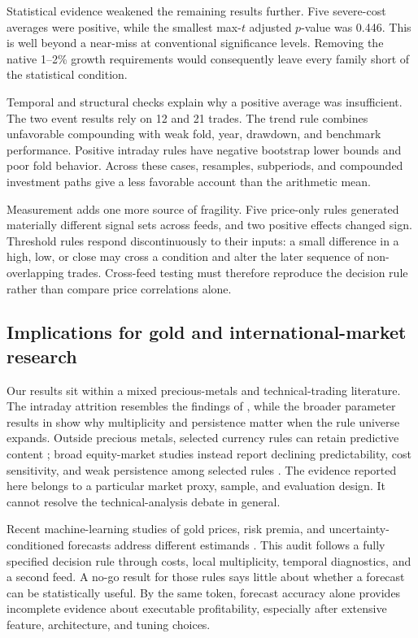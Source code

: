 Statistical evidence weakened the remaining results further. Five severe-cost averages were positive, while the smallest max-$t$ adjusted $p$-value was 0.446. This is well beyond a near-miss at conventional significance levels. Removing the native 1--2\% growth requirements would consequently leave every family short of the statistical condition.

Temporal and structural checks explain why a positive average was insufficient. The two event results rely on 12 and 21 trades. The trend rule combines unfavorable compounding with weak fold, year, drawdown, and benchmark performance. Positive intraday rules have negative bootstrap lower bounds and poor fold behavior. Across these cases, resamples, subperiods, and compounded investment paths give a less favorable account than the arithmetic mean.

Measurement adds one more source of fragility. Five price-only rules generated materially different signal sets across feeds, and two positive effects changed sign. Threshold rules respond discontinuously to their inputs: a small difference in a high, low, or close may cross a condition and alter the later sequence of non-overlapping trades. Cross-feed testing must therefore reproduce the decision rule rather than compare price correlations alone.

\subsection{Implications for gold and international-market research}

Our results sit within a mixed precious-metals and technical-trading literature. The intraday attrition resembles the findings of \citet{jin2022}, while the broader parameter results in \citet{batten2018} show why multiplicity and persistence matter when the rule universe expands. Outside precious metals, selected currency rules can retain predictive content \citep{dockery2023}; broad equity-market studies instead report declining predictability, cost sensitivity, and weak persistence among selected rules \citep{rink2023}. The evidence reported here belongs to a particular market proxy, sample, and evaluation design. It cannot resolve the technical-analysis debate in general.

Recent machine-learning studies of gold prices, risk premia, and uncertainty-conditioned forecasts address different estimands \citep{cohen2023,diaz2023,you2025}. This audit follows a fully specified decision rule through costs, local multiplicity, temporal diagnostics, and a second feed. A no-go result for those rules says little about whether a forecast can be statistically useful. By the same token, forecast accuracy alone provides incomplete evidence about executable profitability, especially after extensive feature, architecture, and tuning choices.


